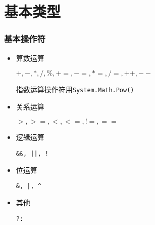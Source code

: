 \section{基本类型}


\begin{frame}
\frametitle{基本操作符}
\begin{itemize}
\item 算数运算 \par
\texttt{$+,-,*,/,\%, +=,-=,*=,/=,++,--$}\par
指数运算操作符用\texttt{System.Math.Pow()}
\item 关系运算 \par
\texttt{$>, >=, <, <=, !=, ==$}
\item 逻辑运算 \par
\texttt{\&\&, ||, !}
\item 位运算 \par
\texttt{\&, |, \^}
\item 其他 \par
\texttt{?:}
\end{itemize}

\end{frame}


